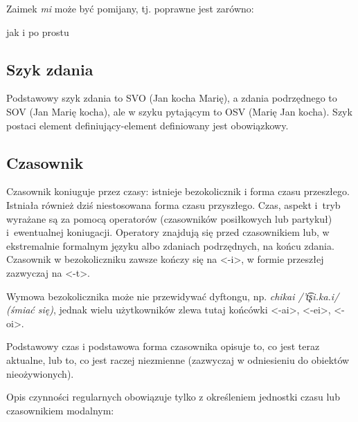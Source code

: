 \noindent
Zaimek \emph{mi} może być pomijany, tj. poprawne jest zarówno: 


\noindent
jak i po prostu


\subsection{Szyk zdania}

Podstawowy szyk zdania to SVO (Jan kocha Marię), a zdania podrzędnego to SOV 
(Jan Marię kocha), ale w szyku pytającym to OSV (Marię Jan kocha). Szyk postaci 
element definiujący-element definiowany jest obowiązkowy.

\subsection{Czasownik}

Czasownik koniuguje przez czasy: istnieje bezokolicznik i forma czasu 
przeszłego. Istniała również dziś niestosowana forma czasu przyszłego. Czas, 
aspekt i~tryb wyrażane są za pomocą operatorów (czasowników posiłkowych lub 
partykuł) i~ewentualnej koniugacji. Operatory znajdują się przed czasownikiem 
lub, w ekstremalnie formalnym języku albo zdaniach podrzędnych, na końcu zdania.
 Czasownik w bezokoliczniku zawsze kończy się na <-i>, w formie przeszłej
  zazwyczaj na <-t>.

Wymowa bezokolicznika może nie przewidywać dyftongu, np. \emph{chikai 
/'t͡ʂi.ka.i/ (śmiać się)}, jednak wielu użytkowników zlewa tutaj końcówki 
<-ai>, <-ei>, <-oi>. 

\skipline

Podstawowy czas i podstawowa forma czasownika opisuje to, co jest teraz 
aktualne, lub to, co jest raczej niezmienne (zazwyczaj w odniesieniu do 
obiektów nieożywionych).


Opis czynności regularnych obowiązuje tylko z określeniem jednostki czasu lub
 czasownikiem modalnym:




